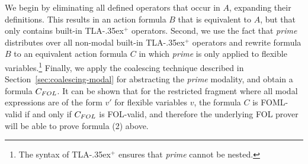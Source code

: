 \documentclass{easychair}
\newcommand{\tlaplus}{\mbox{TLA\kern -.35ex$^+$}\xspace}
\newcommand{\FOL}[1]{\ensuremath{#1_{\textit{\scriptsize FOL}}}}
\newcommand{\modal}{\nabla}
\newcommand{\edmargin}[2]{\marginpar{\raggedright\footnotesize\color{red}#1: #2}}
\newcommand{\edmargin}[2]{}
\def\tlnote{\ednote{TL}}
\def\tlmargin{\edmargin{TL}}
\begin{document}
We begin by eliminating all defined operators that occur in $A$, expanding their
definitions. This results in an action formula $B$ that is equivalent to $A$,
but that only contains built-in \tlaplus operators. Second, we use the fact that
\emph{prime} distributes over all non-modal built-in \tlaplus operators and rewrite
formula $B$ to an equivalent action formula $C$ in which \emph{prime} is only
applied to flexible variables.\footnote{%
  The syntax of \tlaplus ensures that \emph{prime} cannot be nested.
} %
Finally, we apply the coalescing technique described in
Section~\ref{sec:coalescing-modal} for abstracting the \emph{prime} modality,
and obtain a formula $\FOL{C}$. It 
can be shown
that for the restricted
fragment where all modal expressions are of the form $v'$ for flexible
variables $v$, the formula $C$ is FOML-valid if and only if $\FOL{C}$ is FOL-valid,
and therefore the
underlying FOL prover will be able to prove formula (2) above.
\end{document}
